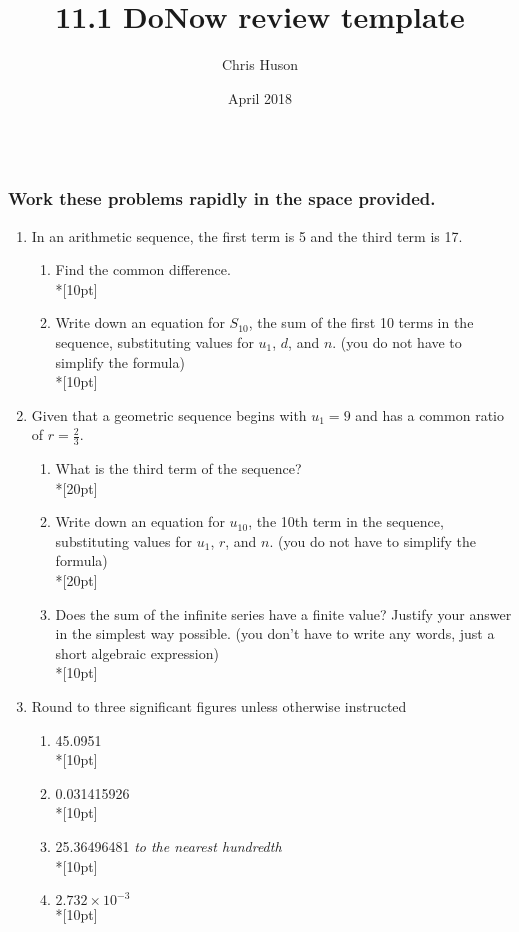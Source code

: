 \documentclass[12pt, oneside]{article}
\title{11.1 DoNow review template}
\author{Chris Huson}
\date{April 2018}
\begin{document}
\subsubsection*{\\ \textnormal{Work these problems rapidly in the space provided.}}

\begin{enumerate}

\item In an arithmetic sequence, the first term is 5 and the third term is 17.
\begin{enumerate}
    \item Find the common difference.\\*[10pt]
    \item Write down an equation for $S_{10}$, the sum of the first 10 terms in the sequence, substituting values for $u_1$, $d$, and $n$. (you do not have to simplify the formula)\\*[10pt]
\end{enumerate}

\item Given that a geometric sequence begins with $u_1=9$ and has a common ratio of $r=\frac{2}{3}$.
\begin{enumerate}
    \item What is the third term of the sequence?\\*[20pt]
    \item Write down an equation for $u_{10}$, the 10th term in the sequence, substituting values for $u_1$, $r$, and $n$. (you do not have to simplify the formula)\\*[20pt]
    \item Does the sum of the infinite series have a finite value? Justify your answer in the simplest way possible. (you don't have to write any words, just a short algebraic expression)\\*[10pt]
\end{enumerate}

\item Round to three significant figures unless otherwise instructed
\begin{enumerate}
    \item 45.0951\\*[10pt]
    \item 0.031415926\\*[10pt]
    \item 25.36496481 \emph{to the nearest hundredth}\\*[10pt]
    \item $2.732 \times 10^{-3}$\\*[10pt]
\end{enumerate}


\end{enumerate}
\end{document}
